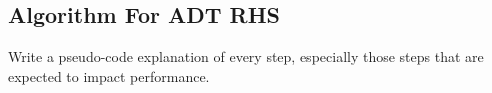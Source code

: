 \documentclass[11pt]{article}
\renewcommand{\vec}[1]{\bm{#1}}
\begin{document}
\subsection{Algorithm For ADT RHS}
Write a pseudo-code explanation of every step, especially those steps that are expected to impact performance. 
\end{document}
